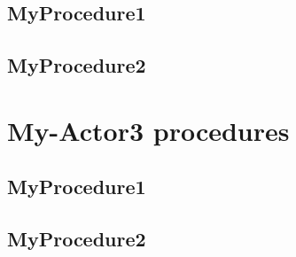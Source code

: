 \subsection{MyProcedure1}
\subsection{MyProcedure2}


\section{My-Actor3 procedures}

\subsection{MyProcedure1}
\subsection{MyProcedure2}















